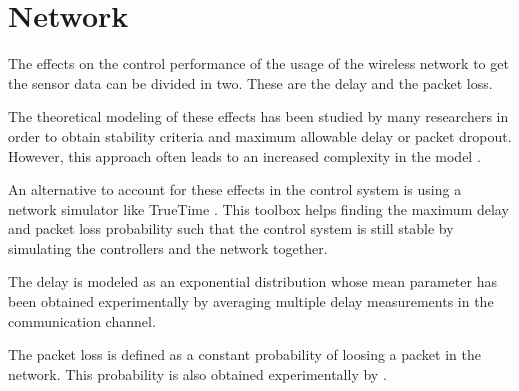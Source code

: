 \section{Network}
The effects on the control performance of the usage of the wireless network to get the sensor data can be divided in two. These are the delay and the packet loss.

The theoretical modeling of these effects has been studied by many researchers in order to obtain stability criteria and maximum allowable delay or packet dropout. However, this approach often leads to an increased complexity in the model .

An alternative to account for these effects in the control system is using a network simulator like TrueTime \cite{TrueTime}. This toolbox helps finding the maximum delay and packet loss probability such that the control system is still stable by simulating the controllers and the network together.

The delay is modeled as an exponential distribution whose mean parameter has been obtained experimentally by averaging multiple delay measurements in the communication channel. 

The packet loss is defined as a constant probability of loosing a packet in the network. This probability is also obtained experimentally by .